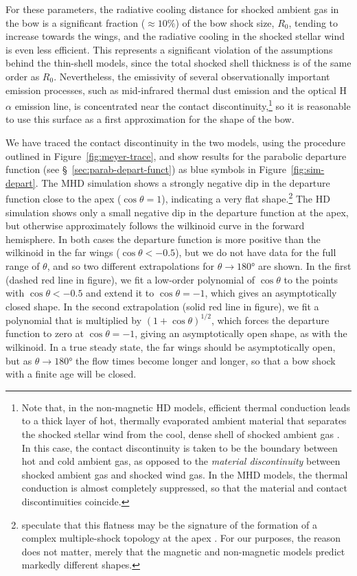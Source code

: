 For these parameters, the radiative cooling distance for shocked
ambient gas in the bow is a significant fraction (\(\approx 10\%\)) of the
bow shock size, \(R_0\), tending to increase towards the wings, and
the radiative cooling in the shocked stellar wind is even less
efficient.  This represents a significant violation of the assumptions
behind the thin-shell models, since the total shocked shell thickness
is of the same order as \(R_0\).  Nevertheless, the emissivity of
several observationally important emission processes, such as
mid-infrared thermal dust emission and the optical H\(\alpha\) emission
line, is concentrated near the contact discontinuity,\footnote{%
  Note that, in the non-magnetic HD models, efficient thermal
  conduction leads to a thick layer of hot, thermally evaporated
  ambient material that separates the shocked stellar wind from the
  cool, dense shell of shocked ambient gas \citep[see \S~3.3
  of][]{Meyer:2014b}.  In this case, the contact discontinuity is
  taken to be the boundary between hot and cold ambient gas, as
  opposed to the \textit{material discontinuity} between shocked
  ambient gas and shocked wind gas.  In the MHD models, the thermal
  conduction is almost completely suppressed, so that the material and
  contact discontinuities coincide. } %
so it is reasonable to use this surface as a first approximation for
the shape of the bow.

We have traced the contact discontinuity in the two models, using the
procedure outlined in Figure~\ref{fig:meyer-trace}, and show results
for the parabolic departure function (see
\S~\ref{sec:parab-depart-funct}) as blue symbols in
Figure~\ref{fig:sim-depart}.  The MHD simulation shows a strongly
negative dip in the departure function close to the apex
(\(\cos \theta = 1\)), indicating a very flat shape.\footnote{%
  \citet{Meyer:2017a} speculate that this flatness may be the
  signature of the formation of a complex multiple-shock topology at
  the apex \citep{de-Sterck:1999a}.  For our purposes, the reason does
  not matter, merely that the magnetic and non-magnetic models predict
  markedly different shapes. } %
The HD simulation shows only a small negative dip in the departure
function at the apex, but otherwise approximately follows the
wilkinoid curve in the forward hemisphere.  In both cases the
departure function is more positive than the wilkinoid in the far
wings (\(\cos \theta < -0.5\)), but we do not have data for the full range
of \(\theta\), and so two different extrapolations for
\(\theta \to \ang{180}\) are shown.  In the first (dashed red line in
figure), we fit a low-order polynomial of \(\cos \theta\) to the points
with \(\cos \theta < -0.5\) and extend it to \(\cos \theta = -1\), which gives
an asymptotically closed shape.  In the second extrapolation (solid
red line in figure), we fit a polynomial that is multiplied by
\((1 + \cos\theta)^{1/2}\), which forces the departure function to zero at
\(\cos \theta = -1\), giving an asymptotically open shape, as with the
wilkinoid.  In a true steady state, the far wings should be
asymptotically open, but as \(\theta \to \ang{180}\) the flow times become
longer and longer, so that a bow shock with a finite age will be
closed.


